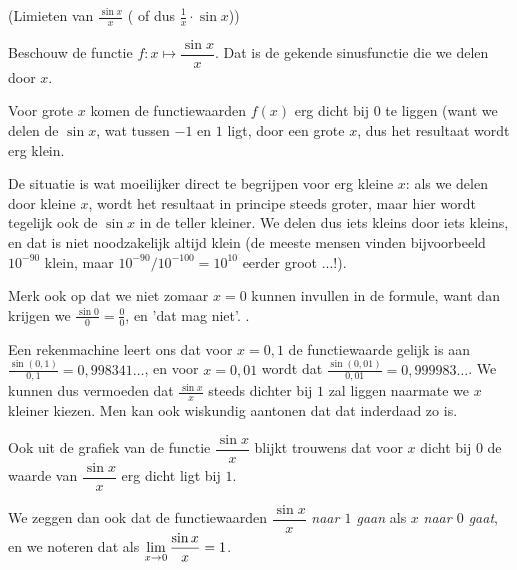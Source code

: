 \documentclass{ximera}
\begin{document}

\begin{example} (Limieten van $\frac{\sin x}{x}$ ( of dus $\frac 1x \cdot\sin x$))
	
Beschouw de functie $f:x\mapsto \dfrac{\sin x}{x}$. Dat is de gekende sinusfunctie die we delen door $x$.

Voor grote $x$ komen de functiewaarden $f(x)$ erg dicht bij $0$ te liggen (want we delen de $\sin x$, wat tussen $-1$ en $1$ ligt, door een grote $x$, dus het resultaat wordt erg klein. 

De situatie is wat moeilijker direct te begrijpen voor erg kleine $x$: als we delen door kleine $x$, wordt het resultaat in principe steeds groter, maar hier wordt tegelijk ook de $\sin x$ in de teller kleiner. We delen dus iets kleins door iets kleins, en dat is niet noodzakelijk altijd klein (de meeste mensen vinden bijvoorbeeld $10^{-90}$ klein, maar $10^{-90}/10^{-100} = 10^{10}$ eerder groot ...!). 

Merk ook op dat we niet zomaar $x=0$ kunnen invullen in de formule, want dan krijgen we $\frac{\sin 0}{0} = \frac{0}{0}$, en 'dat mag niet'. 
. 

Een rekenmachine leert ons dat voor $x=0,1$ de functiewaarde gelijk is aan $\frac{\sin(0,1)}{0,1}=0,998341\dots$, en voor  $x=0,01$ wordt dat $\frac{\sin(0,01)}{0,01}=0,999983\dots$. We  kunnen dus vermoeden dat $\frac{\sin x}{x}$ steeds dichter bij $1$ zal liggen naarmate we $x$ kleiner kiezen. Men kan ook wiskundig aantonen dat dat inderdaad zo is.

Ook uit de grafiek van de functie  $\dfrac{\sin x}{x}$ blijkt trouwens dat voor $x$ dicht bij $0$ de waarde van $\dfrac{\sin x}{x}$ erg dicht ligt bij $1$. 

We zeggen dan ook dat de functiewaarden $\dfrac{\sin x}{x}$ \textit{naar $1$ gaan}  als $x$ \textit{naar $0$ gaat}, en we noteren dat als $\limx \dfrac{\sin x}{x} = 1$.


\end{example}
\end{document}
